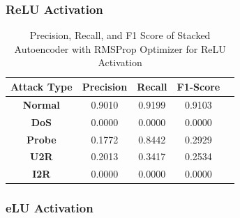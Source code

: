 \documentclass[12pt, a4paper]{report}
\begin{document}
\subsubsection{ReLU Activation}
\begin{table}[ht]
\centering
\captionsetup{justification=centering,margin=2cm}
\begin{tabular}{|c|c|c|c|c|}
\hline
\multicolumn{1}{|c|}{\textbf{Attack Type}} & \multicolumn{1}{c|}{\textbf{Precision}} & \multicolumn{1}{c|}{\textbf{Recall}} & \multicolumn{1}{c|}{\textbf{F1-Score}} \\ \hline
\textbf{Normal}        & 0.9010                                   & 0.9199                                & 0.9103                                                                  \\ \hline
\textbf{DoS}           & 0.0000                                  & 0.0000                                &  0.0000                                                                    \\ \hline
\textbf{Probe}         & 0.1772                                  & 0.8442                                & 0.2929                                                                  \\ \hline
\textbf{U2R}           & 0.2013                                    & 0.3417                                & 0.2534                                                                   \\ \hline
\textbf{I2R}           & 0.0000                                      & 0.0000                                   & 0.0000                                                            \\ \hline         \end{tabular}
\caption{Precision, Recall, and F1 Score of Stacked Autoencoder with RMSProp Optimizer for ReLU Activation}
\label{prf1_rmsprop_relu_auto}
\end{table}

\subsubsection{eLU Activation}
\end{document}
